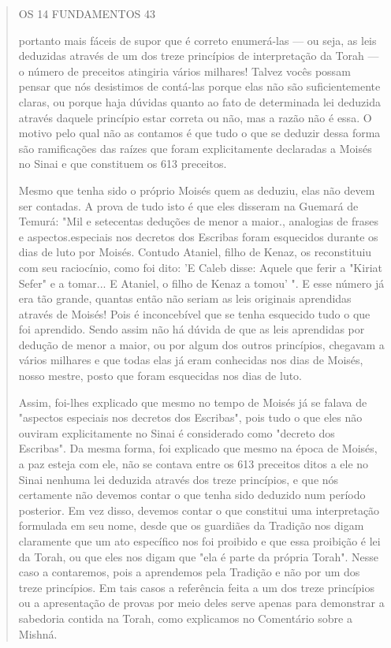 \begin{quote}
OS 14 FUNDAMENTOS 43

portanto mais fáceis de supor que é correto enumerá-las --- ou seja, as
leis de­duzidas através de um dos treze princípios de interpretação da
Torah --- o nú­mero de preceitos atingiria vários milhares! Talvez vocês
possam pensar que nós desistimos de contá-las porque elas não são
suficientemente claras, ou por­que haja dúvidas quanto ao fato de
determinada lei deduzida através daquele princípio estar correta ou não,
mas a razão não é essa. O motivo pelo qual não as contamos é que tudo o
que se deduzir dessa forma são ramificações das raí­zes que foram
explicitamente declaradas a Moisés no Sinai e que constituem os 613
preceitos.

Mesmo que tenha sido o próprio Moisés quem as deduziu, elas não devem
ser contadas. A prova de tudo isto é que eles disseram na Guemará de
Temurá: "Mil e setecentas deduções de menor a maior., analogias de
frases e aspectos.especiais nos decretos dos Escribas foram esquecidos
durante os dias de luto por Moisés. Contudo Ataniel, filho de Kenaz, os
reconstituiu com seu raciocínio, como foi dito: 'E Caleb disse: Aquele
que ferir a "Kiriat Sefer" e a tomar... E Ataniel, o filho de Kenaz a
tomou' ". E esse número já era tão gran­de, quantas então não seriam as
leis originais aprendidas através de Moisés! Pois é inconcebível que se
tenha esquecido tudo o que foi aprendido. Sendo assim não há dúvida de
que as leis aprendidas por dedução de menor a maior, ou por algum dos
outros princípios, chegavam a vários milhares e que todas elas já eram
conhecidas nos dias de Moisés, nosso mestre, posto que foram esqueci­das
nos dias de luto.

Assim, foi-lhes explicado que mesmo no tempo de Moisés já se fala­va de
"aspectos especiais nos decretos dos Escribas", pois tudo o que eles não
ouviram explicitamente no Sinai é considerado como "decreto dos
Escribas". Da mesma forma, foi explicado que mesmo na época de Moisés, a
paz esteja com ele, não se contava entre os 613 preceitos ditos a ele no
Sinai nenhuma lei deduzida através dos treze princípios, e que nós
certamente não devemos contar o que tenha sido deduzido num período
posterior. Em vez disso, deve­mos contar o que constitui uma
interpretação formulada em seu nome, desde que os guardiães da Tradição
nos digam claramente que um ato específico nos foi proibido e que essa
proibição é lei da Torah, ou que eles nos digam que "ela é parte da
própria Torah". Nesse caso a contaremos, pois a aprendemos pela Tradição
e não por um dos treze princípios. Em tais casos a referência feita a um
dos treze princípios ou a apresentação de provas por meio deles serve
apenas para demonstrar a sabedoria contida na Torah, como explicamos no
Co­mentário sobre a Mishná.


\end{quote}
